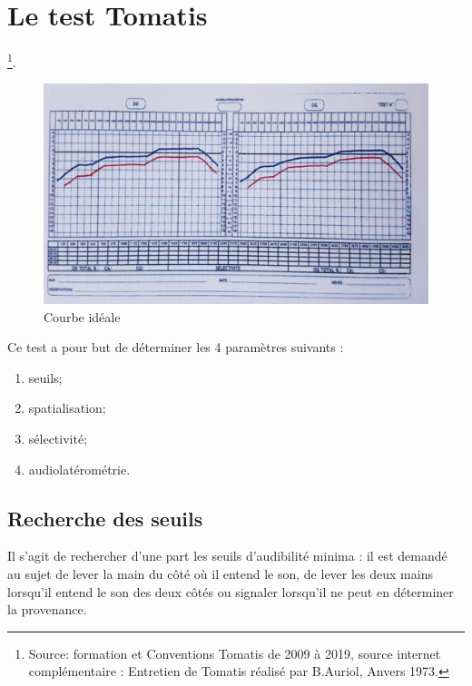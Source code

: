 \section{Le test Tomatis}

 
 
 
 \footnote{Source: formation et
    Conventions Tomatis de 2009 à 2019, source internet complémentaire  : 
  	Entretien de Tomatis réalisé par B.Auriol, Anvers 1973.}.


\begin{figure}
	\centering
	\includegraphics[width=0.7\linewidth]{images/courbeideale.jpg}
	\caption{Courbe idéale}
	\label{fig:courbeideale}
\end{figure}


Ce test a pour but de déterminer les 4 paramètres suivants : 
\begin{enumerate}
\item seuils;
\item spatialisation;
\item sélectivité;
\item audiolatérométrie.
\end{enumerate}

\subsection{Recherche des seuils}

Il s'agit de rechercher d'une part les seuils d'audibilité
minima : il est demandé au sujet de lever la main du côté
où il entend le son, de lever les deux mains lorsqu'il entend le son
des deux côtés ou signaler lorsqu'il ne peut en déterminer la
provenance.


